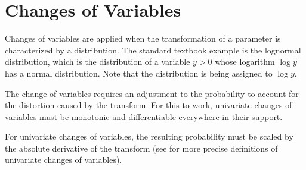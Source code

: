 









\section{Changes of Variables}

Changes of variables are applied when the transformation of a
parameter is characterized by a distribution.  The standard textbook
example is the lognormal distribution, which is the distribution of a
variable $y > 0$ whose logarithm $\log y$ has a normal distribution.
Note that the distribution is being assigned to $\log y$.

The change of variables requires an adjustment to the probability to
account for the distortion caused by the transform.  For this to work,
univariate changes of variables must be monotonic and differentiable
everywhere in their support.

For univariate changes of variables, the resulting probability must be
scaled by the absolute derivative of the transform (see
 for more precise definitions of
univariate changes of variables).

